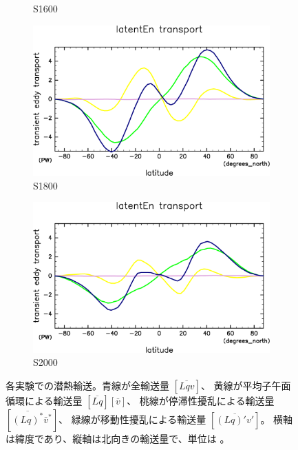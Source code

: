 \documentclass[body]{subfiles}
\begin{document}
\begin{figure}[t]
\begin{subfigure}{.4\textwidth}
		\caption{S1600}\label{潜熱S1600}
	\end{subfigure}
	\begin{subfigure}{.4\textwidth}
		\centering
		\includegraphics[width=\columnwidth]{S1800/MeriHeatTrans@latentEn,time=3650:4015-crop-rotate.pdf}
		\caption{S1800}\label{潜熱S1800}
	\end{subfigure}
	\begin{subfigure}{.4\textwidth}
		\centering
		\includegraphics[width=\columnwidth]{S2000/MeriHeatTrans@latentEn,time=7300:7665-crop-rotate.pdf}
		\caption{S2000}\label{潜熱S2000}
	\end{subfigure}
	\caption[各実験での潜熱輸送の内訳]{
		各実験での潜熱輸送。青線が全輸送量 \([\overline{Lqv}]\)、
		黄線が平均子午面循環による輸送量 \([\overline{Lq}][\overline{v}]\)、
		桃線が停滞性擾乱による輸送量 \([\overline{(Lq)^*}\bar v^*]\)、
		緑線が移動性擾乱による輸送量 \([\overline{(Lq)'v'}]\)。
		横軸は緯度であり、縦軸は北向きの輸送量で、単位は 。
	}\label{潜熱}
\end{figure}
\end{document}
